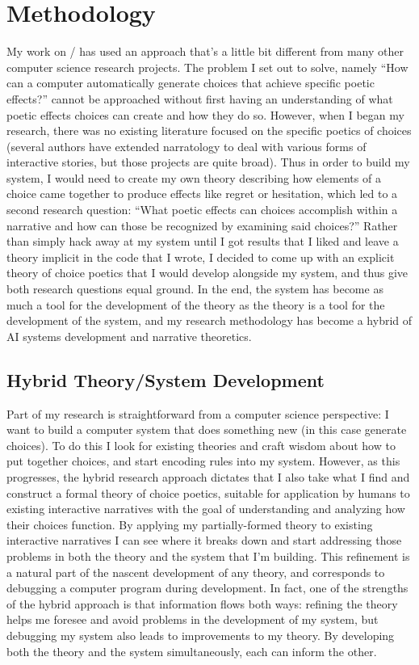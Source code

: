 \chapter{Methodology}

\label{ch:method}

My work on \dunyazad/ has used an approach that's a little bit different from many other computer science research projects.
%
The problem I set out to solve, namely ``How can a computer automatically generate choices that achieve specific poetic effects?'' cannot be approached without first having an understanding of what poetic effects choices can create and how they do so.
%
However, when I began my research, there was no existing literature focused on the specific poetics of choices (several authors have extended narratology to deal with various forms of interactive stories, but those projects are quite broad).
%
Thus in order to build my system, I would need to create my own theory describing how elements of a choice came together to produce effects like regret or hesitation, which led to a second research question: ``What poetic effects can choices accomplish within a narrative and how can those be recognized by examining said choices?''
%
Rather than simply hack away at  my system until I got results that I liked and leave a theory implicit in the code that I wrote, I decided to come up with an explicit theory of choice poetics that I would develop alongside my system, and thus give both research questions equal ground.
%
In the end, the system has become as much a tool for the development of the theory as the theory is a tool for the development of the system, and my research methodology has become a hybrid of AI systems development and narrative theoretics.


\section{Hybrid Theory/System Development}

Part of my research is straightforward from a computer science perspective: I want to build a computer system that does something new (in this case generate choices).
%
To do this I look for existing theories and craft wisdom about how to put together choices, and start encoding rules into my system.
%
However, as this progresses, the hybrid research approach dictates that I also take what I find and construct a formal theory of choice poetics, suitable for application by humans to existing interactive narratives with the goal of understanding and analyzing how their choices function.
%
By applying my partially-formed theory to existing interactive narratives I can see where it breaks down and start addressing those problems in both the theory and the system that I'm building.
%
This refinement is a natural part of the nascent development of any theory, and corresponds to debugging a computer program during development.
%
In fact, one of the strengths of the hybrid approach is that information flows both ways: refining the theory helps me foresee and avoid problems in the development of my system, but debugging my system also leads to improvements to my theory.
%
By developing both the theory and the system simultaneously, each can inform the other.


